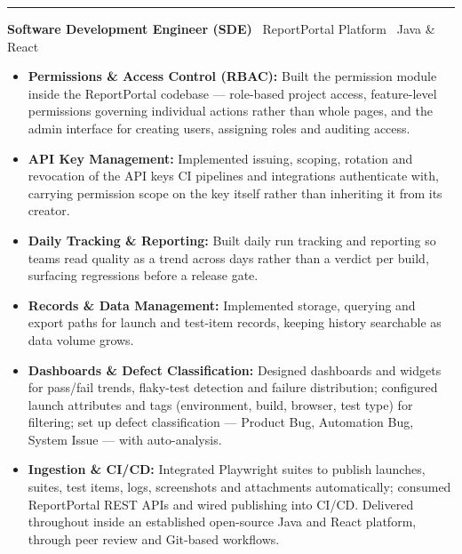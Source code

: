 \documentclass[a4paper,10pt]{article}
\newcommand{\role}[2]{%
  \vspace{5pt}%
  \noindent\textcolor{accent}{\rule[-2pt]{2.6pt}{12pt}}\hspace{6pt}%
  {\color{ink}\bfseries #1}%
  {\color{muted} \textemdash\ #2}%
  \par\vspace{1pt}%
}
\newcommand{\lead}[1]{{\color{ink}\bfseries #1}}
\begin{document}
\role{Software Development Engineer (SDE)}{ReportPortal Platform \textperiodcentered\ Java \& React}
\begin{itemize}
  \item \lead{Permissions \& Access Control (RBAC):} Built the permission module inside the
    ReportPortal codebase — role-based project access, feature-level permissions governing
    individual actions rather than whole pages, and the admin interface for creating users,
    assigning roles and auditing access.
  \item \lead{API Key Management:} Implemented issuing, scoping, rotation and revocation of the
    API keys CI pipelines and integrations authenticate with, carrying permission scope on the key
    itself rather than inheriting it from its creator.
  \item \lead{Daily Tracking \& Reporting:} Built daily run tracking and reporting so teams read
    quality as a trend across days rather than a verdict per build, surfacing regressions before a
    release gate.
  \item \lead{Records \& Data Management:} Implemented storage, querying and export paths for
    launch and test-item records, keeping history searchable as data volume grows.
  \item \lead{Dashboards \& Defect Classification:} Designed dashboards and widgets for pass/fail
    trends, flaky-test detection and failure distribution; configured launch attributes and tags
    (environment, build, browser, test type) for filtering; set up defect classification — Product
    Bug, Automation Bug, System Issue — with auto-analysis.
  \item \lead{Ingestion \& CI/CD:} Integrated Playwright suites to publish launches, suites, test
    items, logs, screenshots and attachments automatically; consumed ReportPortal REST APIs and
    wired publishing into CI/CD. Delivered throughout inside an established open-source Java and
    React platform, through peer review and Git-based workflows.
\end{itemize}
\end{document}
